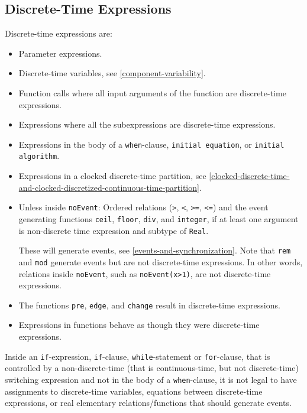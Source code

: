 \subsection{Discrete-Time Expressions}\label{discrete-time-expressions}

Discrete-time expressions are:
\begin{itemize}
\item
  Parameter expressions.
\item
  Discrete-time variables, see \cref{component-variability}.
\item
  Function calls where all input arguments of the function are discrete-time expressions.
\item
  Expressions where all the subexpressions are discrete-time expressions.
\item
  Expressions in the body of a \lstinline!when!-clause, \lstinline!initial equation!, or \lstinline!initial algorithm!.
\item
  Expressions in a clocked discrete-time partition, see \cref{clocked-discrete-time-and-clocked-discretized-continuous-time-partition}.
\item
  Unless inside \lstinline!noEvent!: Ordered relations (\lstinline!>!, \lstinline!<!, \lstinline!>=!, \lstinline!<=!) and the event generating functions \lstinline!ceil!, \lstinline!floor!, \lstinline!div!, and \lstinline!integer!, if at least one argument is non-discrete time expression and subtype of \lstinline!Real!.
  \begin{nonnormative}
  These will generate events, see \cref{events-and-synchronization}.
  Note that \lstinline!rem! and \lstinline!mod! generate events but are not discrete-time expressions.
  In other words, relations inside \lstinline!noEvent!, such as \lstinline!noEvent(x>1)!, are not discrete-time expressions.
  \end{nonnormative}
\item
  The functions \lstinline!pre!, \lstinline!edge!, and \lstinline!change! result in discrete-time expressions.
\item
  Expressions in functions behave as though they were discrete-time expressions.
\end{itemize}

Inside an \lstinline!if!-expression, \lstinline!if!-clause, \lstinline!while!-statement or \lstinline!for!-clause, that is controlled by a non-discrete-time (that is continuous-time, but not discrete-time) switching expression and not in the body of a \lstinline!when!-clause, it is not legal to have assignments to discrete-time variables, equations between discrete-time expressions, or real elementary relations/functions that should generate events.

